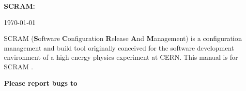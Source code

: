 \documentclass[12pt,twoside]{report}
\begin{document}
\newcommand{\iie}{\emph{i.e.\ }}
\newcommand{\ieg}{\emph{e.g.\ }}
\newcommand{\ietc}{\emph{etc.\ }}
\newcommand{\ie}{i.e.\ }
\newcommand{\eg}{e.g.\ }
\newcommand{\etc}{etc.\ }

\renewcommand{\descriptionlabel}[1]{
  \setlength{\evensidemargin}{\oddsidemargin}
\rm{#1}}%

\pagestyle{empty}
\begin{titlepage}
  \vspace{8cm}
  \begin{latexonly}
    \begin{center}
      {\Large\bf SCRAM: \thisrelease } \\ \vspace{1cm}
    \end{center}
  \end{latexonly}
  
  \vspace{5cm}    
  \begin{center}
    \begin{indentlist}{2.5cm}{3.0cm}
      \authorname
      \today
    \end{indentlist}
  \end{center}
  \vspace{3cm}
  
  
  \ni SCRAM ({\bf S}oftware {\bf C}onfiguration 
  {\bf R}elease {\bf A}nd  {\bf M}anagement) is a configuration
  management and build tool originally conceived for the software 
  development environment of a high-energy physics experiment at
  CERN. This manual is for SCRAM \thisrelease.
  \bigskip\bigskip
  \bigskip\bigskip
  \begin{center}
    \textbf{Please report bugs to \savannahURL}
  \end{center}
\end{titlepage}

\pagestyle{plain}
\tableofcontents            %
\listoffigures
\pagestyle{plain}
\pagestyle{fancy}











\small
\printindex
\normalsize

\end{document}
